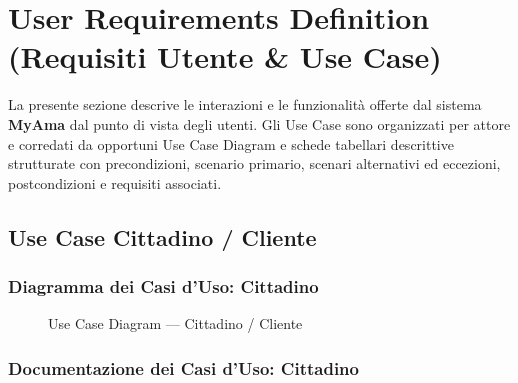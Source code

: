 \section{User Requirements Definition (Requisiti Utente \& Use Case)}

La presente sezione descrive le interazioni e le funzionalità offerte dal sistema \textbf{MyAma} dal punto di vista degli utenti. Gli Use Case sono organizzati per attore e corredati da opportuni Use Case Diagram e schede tabellari descrittive strutturate con precondizioni, scenario primario, scenari alternativi ed eccezioni, postcondizioni e requisiti associati.

\subsection{Use Case Cittadino / Cliente}

\subsubsection{Diagramma dei Casi d'Uso: Cittadino}
\begin{figure}[H]
    \centering
    \caption{Use Case Diagram --- Cittadino / Cliente}
    \label{fig:uc_cittadino}
\end{figure}

\subsubsection{Documentazione dei Casi d'Uso: Cittadino}

